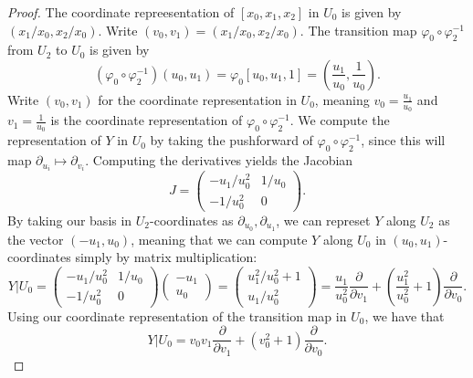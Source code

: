 \documentclass[11pt, letterpaper]{article}
\begin{document}
\begin{proof}
	The coordinate repreesentation of $[x_0,x_1,x_2]$ in $U_0$ is given by $(x_1/x_0,x_2/x_0)$. Write $(v_0,v_1)=\left( x_1/x_0,x_2/x_0 \right) $. The transition map $\varphi _0 \circ \varphi _2^{-1} $ from $U_2$ to $U_0$ is given by
	\[
		(\varphi _0\circ \varphi _2^{-1} )(u_0,u_1)=\varphi _0\left[ u_0,u_1,1 \right] =\left( \frac{u_1}{u_0} ,\frac{1}{u_0}  \right) 
	.\]
	Write $(v_0,v_1)$ for the coordinate representation in $U_0$, meaning $v_0=\frac{u_1}{u_0} $ and $v_1=\frac{1}{u_0} $ is the coordinate representation of $\varphi _0\circ \varphi _2^{-1} $. We compute the representation of $Y$ in $U_0$ by taking the pushforward of $\varphi _0\circ \varphi _2^{-1} $, since this will map $\partial _{u_i} \mapsto \partial _{v_i} $. Computing the derivatives yields the Jacobian
	\[
		J=\begin{pmatrix}
		-u_1/u_0^2 & 1/u_0 \\
		-1/u_0^2 & 0
		\end{pmatrix}
	.\]
	By taking our basis in $U_2$-coordinates as $\partial _{u_0} ,\partial _{u_1} $, we can represet $Y$ along $U_2$ as the vector $(-u_1,u_0)$, meaning that we can compute $Y$ along $U_0$ in $(u_0,u_1)$-coordinates simply by matrix multiplication:
	\[
		Y|U_0=\begin{pmatrix}
		-u_1/u_0^2 & 1/u_0 \\
		-1/u_0^2 & 0
		\end{pmatrix}\begin{pmatrix}
		-u_1 \\
		u_0
		\end{pmatrix}=\begin{pmatrix}
		u_1^2/u_0^2+1 \\
		u_1/u_0^2
		\end{pmatrix}=\frac{u_1}{u_0^2} \frac{\partial }{\partial v_1} +\left( \frac{u_1^2}{u_0^2} +1 \right) \frac{\partial }{\partial v_0} 
	.\]
	Using our coordinate representation of the transition map in $U_0$, we have that
	\[
		Y|U_0= v_0v_1 \frac{\partial }{\partial v_1} +\left( v_0^2+1 \right) \frac{\partial }{\partial v_0} 
	.\]
	

\end{proof}
\end{document}
